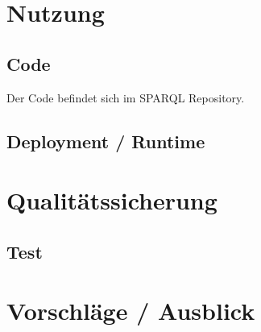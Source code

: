 \section{Nutzung}
\subsection{Code}
Der Code befindet sich im SPARQL Repository.

\subsection{Deployment / Runtime}


\section{Qualitätssicherung}


\subsection{Test}


\section{Vorschläge / Ausblick}


